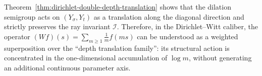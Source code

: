 \begin{remark}
Theorem~\ref{thm:dirichlet-double-depth-translation} shows that the dilation semigroup acts on \((Y_{\sigma},Y_t)\) as a translation along the diagonal direction and strictly preserves the ray invariant \(\mathcal{I}\).
Therefore, in the Dirichlet--Witt caliber, the operator
\(
(Wf)(s)=\sum_{m\ge 1}\frac{1}{m}f(ms)
\)
can be understood as a weighted superposition over the ``depth translation family'': its structural action is concentrated in the one-dimensional accumulation of \(\log m\), without generating an additional continuous parameter axis.
\end{remark}
